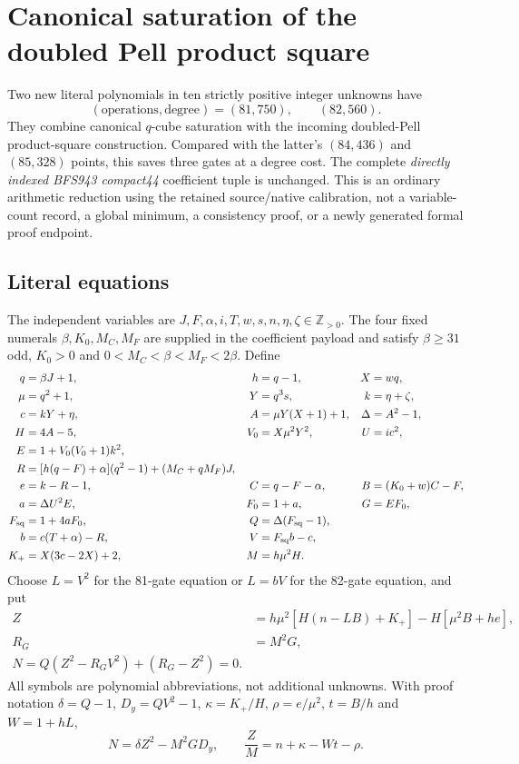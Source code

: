 \section{Canonical saturation of the doubled Pell product square}
\label{sec:positive81}
Two new literal polynomials in ten strictly positive integer unknowns have
\[
 (\text{operations},\text{degree})=(81,750),\qquad(82,560).
\]
They combine canonical $q$-cube saturation with the incoming doubled-Pell
product-square construction. Compared with the latter's $(84,436)$ and
$(85,328)$ points, this saves three gates at a degree cost. The complete
\emph{directly indexed BFS943 compact44} coefficient tuple is unchanged.
This is an ordinary arithmetic reduction using the retained source/native
calibration, not a variable-count record, a global minimum, a consistency
proof, or a newly generated formal proof endpoint.

\subsection{Literal equations}
The independent variables are
$J,F,\alpha,i,T,w,s,n,\eta,\zeta\in\mathbb Z_{>0}$.
The four fixed numerals $\beta,K_0,M_C,M_F$ are supplied in the coefficient
payload and satisfy $\beta\ge31$ odd, $K_0>0$ and
$0<M_C<\beta<M_F<2\beta$. Define
\begin{align*}
q&=\beta J+1,& h&=q-1,& X&=wq,\\
\mu&=q^2+1,&Y&=q^3s,&k&=\eta+\zeta,\\
c&=kY+\eta,&A&=\mu Y(X+1)+1,&\Delta&=A^2-1,\\
H&=4A-5,&V_0&=X\mu^2Y^2,&U&=ic^2,\\
E&=1+V_0(V_0+1)k^2,\\
R&=[h(q-F)+\alpha](q^2-1)+(M_C+qM_F)J,\\
e&=k-R-1,&C&=q-F-\alpha,&B&=(K_0+w)C-F,\\
a&=\Delta U^2E,&F_0&=1+a,&G&=EF_0,\\
F_{\rm sq}&=1+4aF_0,&Q&=\Delta(F_{\rm sq}-1),\\
b&=c(T+\alpha)-R,&V&=F_{\rm sq}b-c,\\
K_+&=X(3c-2X)+2,&M&=h\mu^2H.
\end{align*}
Choose $L=V^2$ for the 81-gate equation or $L=bV$ for the 82-gate equation,
and put
\begin{align*}
 Z&=h\mu^2[H(n-LB)+K_+]-H[\mu^2B+he],\\
 R_G&=M^2G,\\
 \boxed{N=Q(Z^2-R_GV^2)+(R_G-Z^2)=0.}
\end{align*}
All symbols are polynomial abbreviations, not additional unknowns.
With proof notation $\delta=Q-1$, $D_y=QV^2-1$,
$\kappa=K_+/H$, $\rho=e/\mu^2$, $t=B/h$ and $W=1+hL$,
\begin{equation}
 N=\delta Z^2-M^2GD_y,
 \qquad \frac ZM=n+\kappa-Wt-\rho.
 \label{eq:positive81-carrier}
\end{equation}

